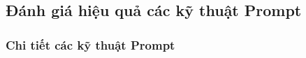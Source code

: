 \subsection{Đánh giá hiệu quả các kỹ thuật Prompt}

\subsubsection{Chi tiết các kỹ thuật Prompt}




